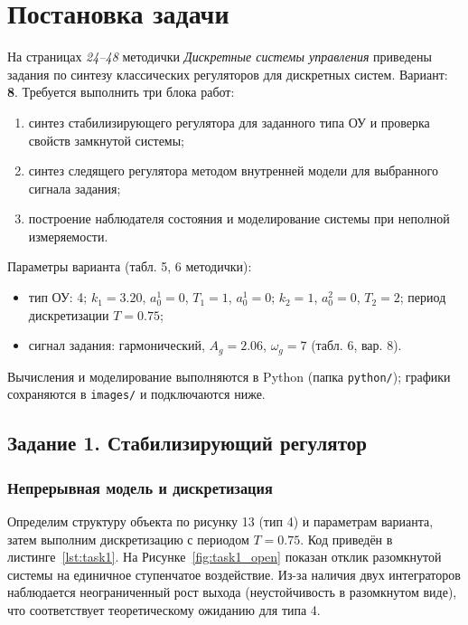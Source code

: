 
\chapter{Постановка задачи}
На страницах \textit{24--48} методички \textit{Дискретные системы управления} приведены задания по синтезу классических регуляторов для дискретных систем. Вариант: \textbf{8}. Требуется выполнить три блока работ: 
\begin{enumerate}
    \item синтез стабилизирующего регулятора для заданного типа ОУ и проверка свойств замкнутой системы; 
    \item синтез следящего регулятора методом внутренней модели для выбранного сигнала задания; 
    \item построение наблюдателя состояния и моделирование системы при неполной измеряемости.
\end{enumerate}

Параметры варианта (табл. 5, 6 методички):
\begin{itemize}
    \item тип ОУ: 4; $k_1=3.20$, $a_0^1=0$, $T_1=1$, $a_0^1=0$; $k_2=1$, $a_0^2=0$, $T_2=2$; период дискретизации $T=0.75$;
    \item сигнал задания: гармонический, $A_g=2.06$, $\omega_g=7$ (табл. 6, вар. 8).
\end{itemize}

Вычисления и моделирование выполняются в Python (папка \texttt{python/}); графики сохраняются в \texttt{images/} и подключаются ниже.

\section{Задание 1. Стабилизирующий регулятор}
\subsection{Непрерывная модель и дискретизация}
Определим структуру объекта по рисунку 13 (тип 4) и параметрам варианта, затем выполним дискретизацию с периодом $T=0.75$. Код приведён в листинге~\ref{lst:task1}. На Рисунке~\ref{fig:task1_open} показан отклик разомкнутой системы на единичное ступенчатое воздействие. Из-за наличия двух интеграторов наблюдается неограниченный рост выхода (неустойчивость в разомкнутом виде), что соответствует теоретическому ожиданию для типа 4.


